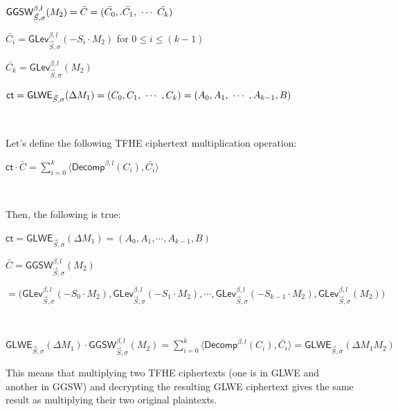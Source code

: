 $\textsf{GGSW}_{\vec{S}, \sigma}^{\beta, l}(M_2) = {\bar{C}} = (\bar{C_0},. \bar{C_1}, \text{ } \text{$\cdots$} \text{ } \bar{C_k})$ 

$\bar{C_i} = \textsf{GLev}_{\vec{S}, \sigma}^{\beta, l}(-S_i \cdot M_2)$ for $0 \leq i \leq (k-1)$

$\bar{C_k} = \textsf{GLev}_{\vec{S}, \sigma}^{\beta, l}(M_2)$

$\textsf{ct} = \textsf{GLWE}_{\vec{S}, \sigma}(\Delta M_1) = (C_0, C_1, \text{ } \text{$\cdots$} \text{ }, C_k) = (A_0, A_1, \text{ } \text{$\cdots$} \text{ }, A_{k-1}, B)$

$ $

\noindent Let's define the following TFHE ciphertext multiplication operation: 

$\textsf{ct} \cdot {\bar{C}} = \sum\limits_{i=0}^{k}\langle \textsf{Decomp}^{\beta, l}(C_i), \bar{C_i} \rangle$

$ $

\noindent Then, the following is true:

\begin{tcolorbox}[title={\textbf{\tboxlabel{\ref*{subsubsec:tfhe-glwe-to-ggsw-multiplication}} Generalization to GLWE-to-GGSW Multiplication}}]
$\textsf{ct} = \textsf{GLWE}_{\vec{S}, \sigma}(\Delta M_1) = (A_0, A_1, \cdots, A_{k-1}, B)$

$\bar{C} = \textsf{GGSW}_{\vec{S}, \sigma}^{\beta, l}(M_2)$

$ = \bm(\textsf{GLev}_{\vec{S}, \sigma}^{\beta, l}(-S_0\cdot M_2), \textsf{GLev}_{\vec{S}, \sigma}^{\beta, l}(-S_1\cdot M_2), \cdots, \textsf{GLev}_{\vec{S}, \sigma}^{\beta, l}(-S_{k-1}\cdot M_2), \textsf{GLev}_{\vec{S}, \sigma}^{\beta, l}(M_2)\bm)$

$ $

$\textsf{GLWE}_{\vec{S}, \sigma}(\Delta M_1) \cdot \textsf{GGSW}_{\vec{S}, \sigma}^{\beta, l}(M_2) = \sum\limits_{i=0}^{k}\langle \textsf{Decomp}^{\beta, l}(C_i), \bar{C_i} \rangle = \textsf{GLWE}_{\vec{S}, \sigma}(\Delta M_1 M_2)$
\end{tcolorbox}

This means that multiplying two TFHE ciphertexts (one is in GLWE and another in GGSW) and decrypting the resulting GLWE ciphertext gives the same result as multiplying their two original plaintexts. 

$ $

